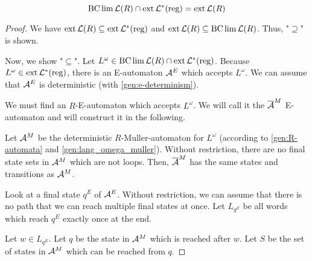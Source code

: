 \begin{lemma}
\label{gen:R-bclim-cap-ext}
\[ \operatorname{BC} \lim \mathcal{L}(R) \cap \operatorname{ext} \mathcal{L}^*(\text{reg}) = \operatorname{ext} \mathcal{L}(R) \]

\begin{proof}
We have $\operatorname{ext} \mathcal{L}(R) \subseteq \operatorname{ext} \mathcal{L}^*(\text{reg})$ and $\operatorname{ext} \mathcal{L}(R) \subseteq \operatorname{BC} \lim \mathcal{L}(R)$. Thus, "$\supseteq$" is shown.

Now, we show "$\subseteq$". Let $L^\omega \in \operatorname{BC} \lim \mathcal{L}(R) \cap \operatorname{ext} \mathcal{L}^*(\text{reg})$. Because $L^\omega \in \operatorname{ext} \mathcal{L}^*(\text{reg})$, there is an E-automaton $\mathcal{A}^E$ which accepts $L^\omega$. We can assume that $\mathcal{A}^E$ is deterministic (with \ref{gen:e-determinism}).

We must find an $R$-E-automaton which accepts $L^\omega$. We will call it the $\overline{\mathcal{A}}^M$ E-automaton and will construct it in the following.

Let $\mathcal{A}^M$ be the deterministic $R$-Muller-automaton for $L^\omega$ (according to \ref{gen:R-automata} and \ref{gen:lang_omega_muller}). Without restriction, there are no final state sets in $\mathcal{A}^M$ which are not loops. Then, $\overline{\mathcal{A}}^M$ has the same states and transitions as $\mathcal{A}^M$.

Look at a final state $q^E$ of $\mathcal{A}^E$. Without restriction, we can assume that there is no path that we can reach multiple final states at once. Let $L_{q^E}$ be all words which reach $q^E$ exactly once at the end.

Let $w \in L_{q^E}$.
Let $q$ be the state in $\mathcal{A}^M$ which is reached after $w$. Let $S$ be the set of states in $\mathcal{A}^M$ which can be reached from $q$.


\end{proof}
\end{lemma}
